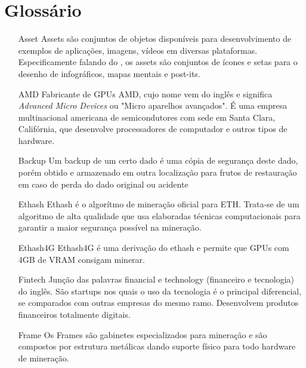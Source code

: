 \chapter*{Glossário}
\pagestyle{empty}

\begin{center}
	\begin{itemize}
		\item[Asset] Assets são conjuntos de objetos disponíveis para desenvolvimento de exemplos de aplicações, imagens, vídeos em diversas plataformas. Especificamente falando do \cite{WHIM}, os assets são conjuntos de ícones e setas para o desenho de infográficos, mapas mentais e post-its.
		 
		\item[AMD] Fabricante de GPUs AMD, cujo nome vem do inglês e significa \textit{Advanced Micro Devices} ou "Micro aparelhos avançados". É uma empresa multinacional americana de semicondutores com sede em Santa Clara, Califórnia, que desenvolve processadores de computador e outros tipos de hardware. 
		
		\item[Backup] Um backup de um certo dado é uma cópia de segurança deste dado, porém obtido e armazenado em outra localização para frutos de restauração em caso de perda do dado original ou  acidente 
		
		\item[Ethash] Ethash é o algorítmo de mineração oficial para ETH. Trata-se de um algoritmo de alta qualidade que usa elaboradas técnicas computacionais para garantir a maior segurança possível na mineração.
		
		\item[Ethash4G] Ethash4G é uma derivação do ethash e permite que GPUs com 4GB de VRAM consigam minerar.
		
		\item[Fintech] Junção das palavras financial e technology (financeiro e tecnologia) do inglês. São startups nos quais o uso da tecnologia é o principal diferencial, se comparados com outras empresas do mesmo ramo. Desenvolvem produtos financeiros totalmente digitais. 
		
		\item[Frame] Os Frames são gabinetes especializados para mineração e são compostos por estrutura metálicas dando suporte físico para todo hardware de mineração.
		

\end{itemize}
\end{center}
